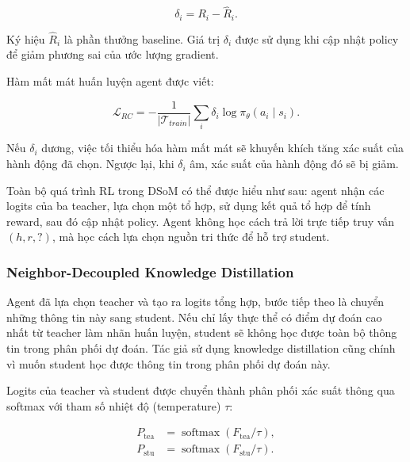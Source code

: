 \begin{equation}
\delta_i=R_i-\hat{R}_i.
\end{equation}

Ký hiệu $\hat{R}_i$ là phần thưởng baseline.
Giá trị $\delta_i$ được sử dụng khi cập nhật policy
để giảm phương sai của ước lượng gradient.

Hàm mất mát huấn luyện agent được viết:

\begin{equation}
\mathcal{L}_{RC}
=-\frac{1}{|\mathcal{T}_{train}|}
\sum_i \delta_i\log\pi_\theta(a_i\mid s_i).
\end{equation}

Nếu $\delta_i$ dương, việc tối thiểu hóa hàm mất
mát sẽ khuyến khích tăng xác suất của hành động
đã chọn. Ngược lại, khi $\delta_i$ âm, xác suất
của hành động đó sẽ bị giảm.

Toàn bộ quá trình RL trong DSoM có thể
được hiểu như sau: agent nhận các logits của ba
teacher, lựa chọn một tổ hợp, sử dụng kết quả tổ
hợp để tính reward, sau đó cập nhật policy. Agent không học cách trả
lời trực tiếp truy vấn $(h,r,?)$, mà học cách
lựa chọn nguồn tri thức để hỗ trợ student.

\subsubsection{Neighbor-Decoupled Knowledge Distillation}


Agent đã lựa chọn teacher và tạo ra logits tổng hợp, bước tiếp theo là chuyển những thông tin này sang student. Nếu chỉ lấy thực thể có điểm dự đoán cao nhất từ teacher làm nhãn huấn luyện, student sẽ không học được toàn bộ thông tin trong phân phối dự đoán. Tác giả sử dụng knowledge distillation cũng chính vì muốn student học được thông tin trong phân phối dự đoán này.


Logits của teacher và student được
chuyển thành phân phối xác suất thông qua softmax
với tham số nhiệt độ (temperature) $\tau$:

\begin{equation}
\begin{aligned}
P_{\mathrm{tea}}&=
\operatorname{softmax}(F_{\mathrm{tea}}/\tau),\\
P_{\mathrm{stu}}&=
\operatorname{softmax}(F_{\mathrm{stu}}/\tau).
\end{aligned}
\end{equation}








